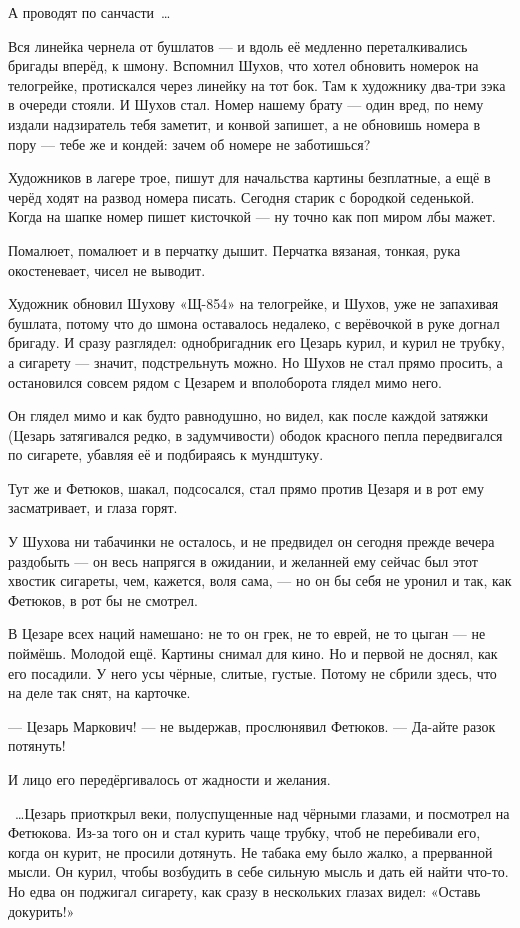 А проводят по санчасти~\dots{}

Вся линейка чернела от бушлатов --- и вдоль её медленно переталкивались бригады вперёд, к шмону. Вспомнил Шухов, что хотел обновить номерок на телогрейке, протискался через линейку на тот бок. Там к художнику два-три зэка в очереди стояли. И Шухов стал. Номер нашему брату --- один вред, по нему издали надзиратель тебя заметит, и конвой запишет, а не обновишь номера в пору --- тебе же и кондей: зачем об номере не заботишься?

Художников в лагере трое, пишут для начальства картины безплатные, а ещё в черёд ходят на развод номера писать. Сегодня старик с бородкой седенькой. Когда на шапке номер пишет кисточкой --- ну точно как поп миром лбы мажет.

Помалюет, помалюет и в перчатку дышит. Перчатка вязаная, тонкая, рука окостеневает, чисел не выводит.

Художник обновил Шухову «Щ-854» на телогрейке, и Шухов, уже не запахивая бушлата, потому что до шмона оставалось недалеко, с верёвочкой в руке догнал бригаду. И сразу разглядел: однобригадник его Цезарь курил, и курил не трубку, а сигарету --- значит, подстрельнуть можно. Но Шухов не стал прямо просить, а остановился совсем рядом с Цезарем и вполоборота глядел мимо него.

Он глядел мимо и как будто равнодушно, но видел, как после каждой затяжки (Цезарь затягивался редко, в задумчивости) ободок красного пепла передвигался по сигарете, убавляя её и подбираясь к мундштуку.

Тут же и Фетюков, шакал, подсосался, стал прямо против Цезаря и в рот ему засматривает, и глаза горят.

У Шухова ни табачинки не осталось, и не предвидел он сегодня прежде вечера раздобыть --- он весь напрягся в ожидании, и желанней ему сейчас был этот хвостик сигареты, чем, кажется, воля сама, --- но он бы себя не уронил и так, как Фетюков, в рот бы не смотрел.

В Цезаре всех наций намешано: не то он грек, не то еврей, не то цыган --- не поймёшь. Молодой ещё. Картины снимал для кино. Но и первой не доснял, как его посадили. У него усы чёрные, слитые, густые. Потому не сбрили здесь, что на деле так снят, на карточке.

--- Цезарь Маркович! --- не выдержав, прослюнявил Фетюков. --- Да-айте разок потянуть!

И лицо его передёргивалось от жадности и желания.

~\dots{}Цезарь приоткрыл веки, полуспущенные над чёрными глазами, и посмотрел на Фетюкова. Из-за того он и стал курить чаще трубку, чтоб не перебивали его, когда он курит, не просили дотянуть. Не табака ему было жалко, а прерванной мысли. Он курил, чтобы возбудить в себе сильную мысль и дать ей найти что-то. Но едва он поджигал сигарету, как сразу в нескольких глазах видел: «Оставь докурить!»

